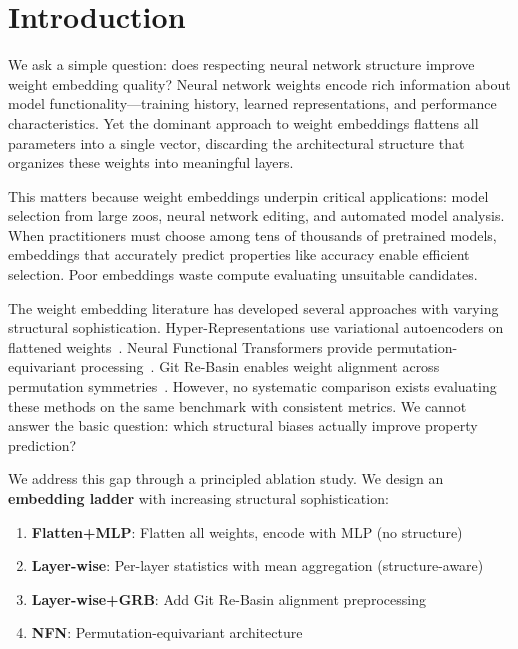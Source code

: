 \section{Introduction}
\label{sec:introduction}

We ask a simple question: does respecting neural network structure improve weight embedding quality? Neural network weights encode rich information about model functionality---training history, learned representations, and performance characteristics. Yet the dominant approach to weight embeddings flattens all parameters into a single vector, discarding the architectural structure that organizes these weights into meaningful layers.

This matters because weight embeddings underpin critical applications: model selection from large zoos, neural network editing, and automated model analysis. When practitioners must choose among tens of thousands of pretrained models, embeddings that accurately predict properties like accuracy enable efficient selection. Poor embeddings waste compute evaluating unsuitable candidates.

The weight embedding literature has developed several approaches with varying structural sophistication. Hyper-Representations use variational autoencoders on flattened weights~\cite{schurholt2022hyper}. Neural Functional Transformers provide permutation-equivariant processing~\cite{zhou2024neural}. Git Re-Basin enables weight alignment across permutation symmetries~\cite{ainsworth2022git}. However, no systematic comparison exists evaluating these methods on the same benchmark with consistent metrics. We cannot answer the basic question: which structural biases actually improve property prediction?

We address this gap through a principled ablation study. We design an \textbf{embedding ladder} with increasing structural sophistication:

\begin{enumerate}
    \item \textbf{Flatten+MLP}: Flatten all weights, encode with MLP (no structure)
    \item \textbf{Layer-wise}: Per-layer statistics with mean aggregation (structure-aware)
    \item \textbf{Layer-wise+GRB}: Add Git Re-Basin alignment preprocessing
    \item \textbf{NFN}: Permutation-equivariant architecture
\end{enumerate}

